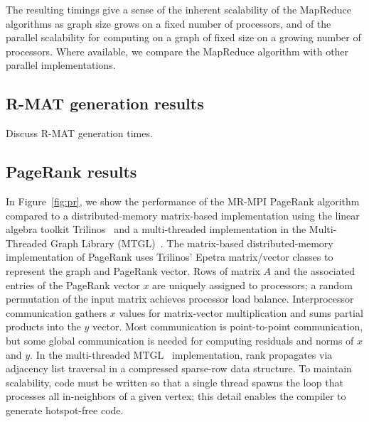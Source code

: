 The resulting timings give a sense of the inherent scalability of the
MapReduce algorithms as graph size grows on a fixed number of
processors, and of the parallel scalability for computing on a graph
of fixed size on a growing number of processors.  Where available, we
compare the MapReduce algorithm with other parallel implementations.

\subsection{R-MAT generation results}
Discuss R-MAT generation times.

\subsection{PageRank results}

In Figure~\ref{fig:pr}, we show the performance of the MR-MPI PageRank algorithm
compared to a
distributed-memory matrix-based implementation using the linear
algebra toolkit Trilinos~\cite{Trilinos-Overview} 
and a multi-threaded
implementation
in the Multi-Threaded Graph Library (MTGL)~\cite{MTGL}.
The matrix-based distributed-memory implementation of PageRank
uses Trilinos' Epetra matrix/vector classes to represent the graph and
PageRank vector.
Rows of matrix $A$ and the associated entries of the PageRank vector $x$
are uniquely assigned to processors; a random permutation of the input
matrix achieves processor load balance.
Interprocessor communication gathers $x$ values for matrix-vector
multiplication and sums partial products into the $y$ vector.
Most communication is point-to-point communication,
but some global communication is needed for computing
residuals and norms of $x$ and $y$.
In the multi-threaded MTGL~\cite{MTGL} implementation,
rank propagates via adjacency list traversal
in a compressed sparse-row data structure.
To maintain scalability, code must
be written so that a single thread spawns the loop that processes all
in-neighbors of a given vertex; this detail enables the compiler to generate
hotspot-free code.

